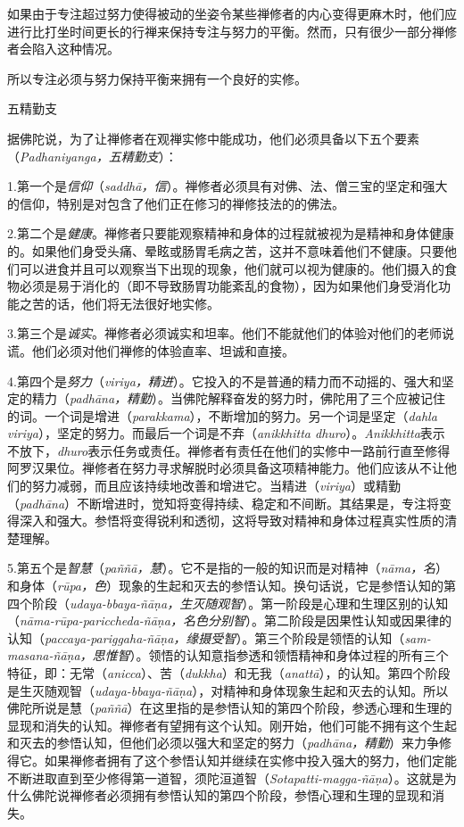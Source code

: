 如果由于专注超过努力使得被动的坐姿令某些禅修者的内心变得更麻木时，他们应进行比打坐时间更长的行禅来保持专注与努力的平衡。然而，只有很少一部分禅修者会陷入这种情况。

所以专注必须与努力保持平衡来拥有一个良好的实修。

\ssssubsectnonib \1五精勤支

据佛陀说，为了让禅修者在观禅实修中能成功，他们必须具备以下五个要素（{\it Padhaniyanga，五精勤支}）：

{
\leftskip=1.6pc
\item{1.}第一个是{\it 信仰}（{\it saddh\=a，信}）。禅修者必须具有对佛、法、僧三宝的坚定和强大的信仰，特别是对包含了他们正在修习的禅修技法的的佛法。
\item{2.}第二个是{\it 健康}。禅修者只要能观察精神和身体的过程就被视为是精神和身体健康的。如果他们身受头痛、晕眩或肠胃毛病之苦，这并不意味着他们不健康。只要他们可以进食并且可以观察当下出现的现象，他们就可以视为健康的。他们摄入的食物必须是易于消化的（即不导致肠胃功能紊乱的食物），因为如果他们身受消化功能之苦的话，他们将无法很好地实修。
\item{3.}第三个是{\it 诚实}。禅修者必须诚实和坦率。他们不能就他们的体验对他们的老师说谎。他们必须对他们禅修的体验直率、坦诚和直接。
\item{4.}第四个是{\it 努力}（{\it viriya，精进}）。它投入的不是普通的精力而不动摇的、强大和坚定的精力（{\it padh\=ana，精勤}）。当佛陀解释奋发的努力时，佛陀用了三个应被记住的词。一个词是增进（{\it parakkama}），\1不断增加的努力。另一个词是坚定（{\it dahla viriya}），坚定的努力。而最后一个词是不弃（{\it anikkhitta dhuro}）。{\it Anikkhitta}表示不放下，{\it dhuro}表示任务或责任。禅修者有责任在他们的实修中一路前行直至修得阿罗汉果位。禅修者在努力寻求解脱时必须具备这项精神能力。他们应该从不让他们的努力减弱，而且应该持续地改善和增进它。当精进（{\it viriya}）或精勤（{\it padh\=ana}）不断增进时，觉知将变得持续、稳定和不间断。其结果是，专注将变得深入和强大。参悟将变得锐利和透彻，这将导致对精神和身体过程真实性质的清楚理解。
\item{5.}第五个是{\it 智慧}（{\it pa\~n\~n\=a，慧}）。它不是指的一般的知识而是对精神（{\it n\=ama，名}）和身体（{\it r\=upa，色}）现象的生起和灭去的参悟认知。换句话说，它是参悟认知的第四个阶段（{\it udaya-bbaya-\~n\=a\d na，生灭随观智}）。第一阶段是心理和生理区别的认知（{\it n\=ama-r\=upa-pariccheda-\~n\=a\d na，名色分别智}）。第二阶段是因果性认知或因果律的认知（{\it paccaya-pariggaha-\~n\=a\d na，缘摄受智}）。第三个阶段是领悟的认知（{\it sam-masana-\~n\=a\d na，思惟智}）。领悟的认知意指参透和领悟精神和身体过程的所有三个特征，即：无常（{\it anicca}）、苦（{\it dukkha}）和无我（{\it anatt\=a}），的认知。第四个阶段是生灭随观\1智（{\it udaya-bbaya-\~n\=a\d na}），对精神和身体现象生起和灭去的认知。所以佛陀所说是慧（{\it pa\~n\~n\=a}）在这里指的是参悟认知的第四个阶段，参透心理和生理的显现和消失的认知。禅修者有望拥有这个认知。刚开始，他们可能不拥有这个生起和灭去的参悟认知，但他们必须以强大和坚定的努力（{\it padh\=ana，精勤}）来力争修得它。如果禅修者拥有了这个参悟认知并继续在实修中投入强大的努力，他们定能不断进取直到至少修得第一道智，须陀洹道智（{\it Sotapatti-magga-\~n\=a\d na}）。这就是为什么佛陀说禅修者必须拥有参悟认知的第四个阶段，参悟心理和生理的显现和消失。

}

